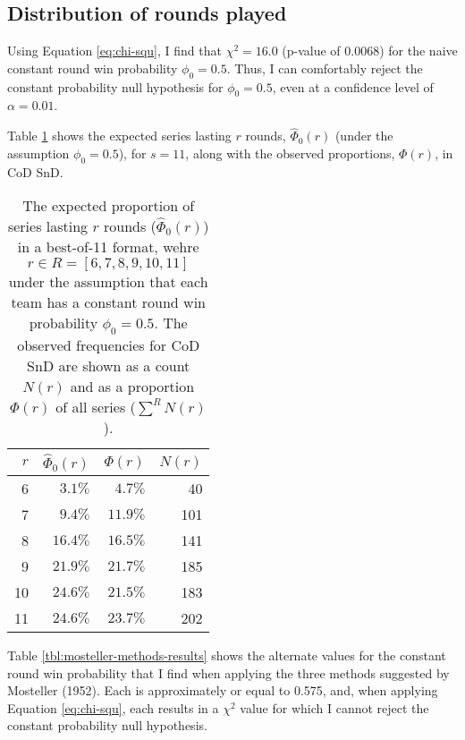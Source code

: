 \documentclass{article}
\begin{document}
\hypertarget{sec:results-rounds-played}{%
\subsection{Distribution of rounds
played}\label{sec:results-rounds-played}}

Using Equation \ref{eq:chi-squ}, I find that \(\chi^2 = 16.0\) (p-value
of 0.0068) for the naive constant round win probability
\(\phi_0 = 0.5\). Thus, I can comfortably reject the constant
probability null hypothesis for \(\phi_0 = 0.5\), even at a confidence
level of \(\alpha = 0.01\).

Table \ref{tbl:cod-prob-series-lasting-r-rounds} shows the expected
series lasting \(r\) rounds, \(\hat{\Phi}_0(r)\) (under the assumption
\(\phi_0 = 0.5\)), for \(s = 11\), along with the observed proportions,
\(\Phi(r)\), in CoD SnD.

\begin{longtable}{rrrr}
\caption{The expected proportion of series lasting $r$ rounds ($\hat{\Phi}_0(r)$) in a best-of-11 format, wehre $r \in R = [6, 7, 8, 9, 10, 11]$ under the assumption that each team has a constant round win probability $\phi_0 = 0.5$. The observed frequencies for CoD SnD are shown as a count $N(r)$ and as a proportion $\Phi(r)$ of all series ($\sum^R N(r)$).}\label{tbl:cod-prob-series-lasting-r-rounds} \\
\toprule
$r$ & $\hat{\Phi}_0(r)$ & $\Phi(r)$ & $N(r)$ \\ 
\midrule
6 & $3.1\%$ & $4.7\%$ & 40 \\ 
7 & $9.4\%$ & $11.9\%$ & 101 \\ 
8 & $16.4\%$ & $16.5\%$ & 141 \\ 
9 & $21.9\%$ & $21.7\%$ & 185 \\ 
10 & $24.6\%$ & $21.5\%$ & 183 \\ 
11 & $24.6\%$ & $23.7\%$ & 202 \\ 
\bottomrule
\end{longtable}

Table \ref{tbl:mosteller-methods-results} shows the alternate values for
the constant round win probability that I find when applying the three
methods suggested by Mosteller (1952). Each is approximately or equal to
0.575, and, when applying Equation \ref{eq:chi-squ}, each results in a
\(\chi^2\) value for which I cannot reject the constant probability null
hypothesis.
\end{document}

